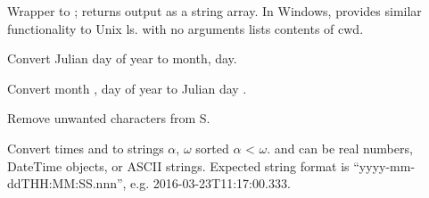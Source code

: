 \documentclass[letterpaper,11pt,english]{sphinxmanual}
\begin{document}
Wrapper to ; returns output as a string array. In Windows, provides similar functionality to Unix ls.  with no arguments lists contents of cwd.

\begin{fulllineitems}
\label{\detokenize{src/Appendices/function_list:j2md}}
\end{fulllineitems}


Convert Julian day  of year  to month, day.

\begin{fulllineitems}
\label{\detokenize{src/Appendices/function_list:md2j}}
\end{fulllineitems}


Convert month , day  of year  to Julian day .

Remove unwanted characters from S.

\begin{fulllineitems}
\label{\detokenize{src/Appendices/function_list:parsetimewin}}
\end{fulllineitems}


Convert times  and  to strings \(\alpha\), \(\omega\) sorted \(\alpha\) \textless{} \(\omega\).
 and  can be real numbers, DateTime objects, or ASCII strings.
Expected string format is “yyyy-mm-ddTHH:MM:SS.nnn”, e.g. 2016-03-23T11:17:00.333.

\begin{fulllineitems}
\label{\detokenize{src/Appendices/function_list:webhdr}}
\end{fulllineitems}
\end{document}
